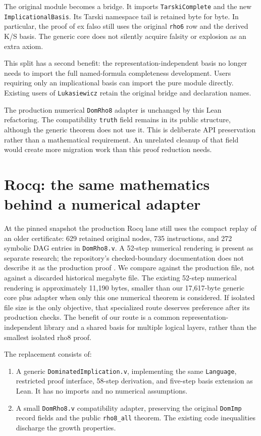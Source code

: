 \documentclass[11pt,letterpaper]{article}
\begin{document}
The original module becomes a bridge. It imports \texttt{TarskiComplete} and
the new \texttt{ImplicationalBasis}. Its Tarski namespace
tail is retained byte for byte. In particular, the proof of ex falso still uses
the original \texttt{rho6} row and the derived K/S basis. The generic core does
not silently acquire falsity or explosion as an extra axiom.

This split has a second benefit: the representation-independent basis no longer
needs to import the full named-formula completeness development. Users requiring
only an implicational basis can import the pure module directly. Existing users
of \texttt{Lukasiewicz} retain the original bridge and declaration names.

The production numerical \texttt{DomRho8} adapter is unchanged by this Lean
refactoring. The compatibility \texttt{truth} field remains in its public
structure, although the generic theorem does not use it. This is deliberate API
preservation rather than a mathematical requirement. An unrelated cleanup of
that field would create more migration work than this proof reduction needs.

\section{Rocq: the same mathematics behind a numerical adapter}

At the pinned snapshot the production Rocq lane still uses the compact replay
of an older certificate: 629 retained original nodes, 735 instructions, and
272 symbolic DAG entries in \texttt{DomRho8.v}. A 52-step numerical rendering is
present as separate research; the repository's checked-boundary documentation
does not describe it as the production proof \cite{rho8cd,rocqsource}. We compare
against the production file, not against a discarded historical megabyte file.
The existing 52-step numerical rendering is approximately 11,190 bytes, smaller
than our 17,617-byte generic core plus adapter when only this one numerical
theorem is considered. If isolated file size is the only objective, that
specialized route deserves preference after its production checks. The benefit
of our route is a common representation-independent library and a shared basis
for multiple logical layers, rather than the smallest isolated rho8 proof.

The replacement consists of:
\begin{enumerate}
\item A generic \texttt{DominatedImplication.v}, implementing the same
\texttt{Language}, restricted proof interface, 58-step derivation, and five-step
basis extension as Lean. It has no imports and no numerical assumptions.
\item A small \texttt{DomRho8.v} compatibility adapter, preserving the original
\texttt{DomImp} record fields and the public \texttt{rho8\_all} theorem.
The existing code inequalities discharge the growth properties.
\end{enumerate}
\end{document}
